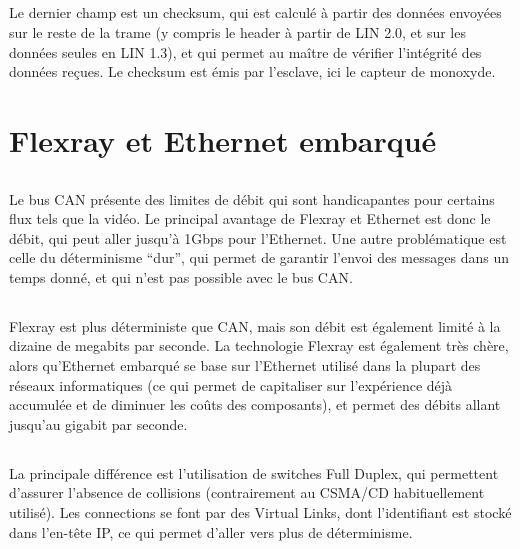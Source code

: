 \documentclass[a4paper]{article}
\begin{document}
\subsection{}
Le dernier champ est un checksum, qui est calculé à partir des données envoyées sur le reste de la trame (y compris le header à partir de LIN 2.0, et sur les données seules en LIN 1.3), et qui permet au maître de vérifier l'intégrité des données reçues. Le checksum est émis par l'esclave, ici le capteur de monoxyde.

\section{Flexray et Ethernet embarqué}

\subsection{}
Le bus CAN présente des limites de débit qui sont handicapantes pour certains flux tels que la vidéo. Le principal avantage de Flexray et Ethernet est donc le débit, qui peut aller jusqu'à 1Gbps pour l'Ethernet. Une autre problématique est celle du déterminisme “dur”, qui permet de garantir l’envoi des messages dans un temps donné, et qui n’est pas possible avec le bus CAN. 

\subsection{}
Flexray est plus déterministe que CAN, mais son débit est également limité à la dizaine de megabits par seconde. La technologie Flexray est également très chère, alors qu’Ethernet embarqué se base sur l’Ethernet utilisé dans la plupart des réseaux informatiques (ce qui permet de capitaliser sur l’expérience déjà accumulée et de diminuer les coûts des composants), et permet des débits allant jusqu’au gigabit par seconde.

\subsection{}
La principale différence est l’utilisation de switches Full Duplex, qui permettent d’assurer l’absence de collisions (contrairement au CSMA/CD habituellement utilisé). Les connections se font par des Virtual Links, dont l’identifiant est stocké dans l’en-tête IP, ce qui permet d’aller vers plus de déterminisme.
\end{document}
